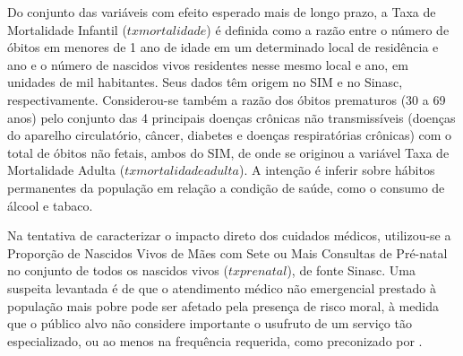 \documentclass[twoside,onecolumn,12pt]{article}
\numberwithin{outputctr}{section}
\begin{document}
Do conjunto das vari\'{a}veis com efeito esperado mais de longo prazo, a Taxa de Mortalidade Infantil ($txmortalidade$) \'{e} definida como a raz\~{a}o entre o n\'{u}mero de \'{o}bitos em menores de 1 ano de idade em um determinado local de resid\^{e}ncia e ano e o n\'{u}mero de nascidos vivos residentes nesse mesmo local e ano, em unidades de mil habitantes. Seus dados t\^{e}m origem no SIM e no Sinasc, respectivamente. Considerou-se tamb\'{e}m a raz\~{a}o dos \'{o}bitos prematuros (30 a 69 anos) pelo conjunto das 4 principais doen\c{c}as cr\^{o}nicas n\~{a}o transmiss\'{i}veis (doen\c{c}as do aparelho circulat\'{o}rio, c\^{a}ncer, diabetes e doen\c{c}as respirat\'{o}rias cr\^{o}nicas) com o total de \'{o}bitos n\~{a}o fetais, ambos do SIM, de onde se originou a vari\'{a}vel Taxa de Mortalidade Adulta ($txmortalidadeadulta$). A inten\c{c}\~{a}o \'{e} inferir sobre h\'{a}bitos permanentes da popula\c{c}\~{a}o em rela\c{c}\~{a}o a condi\c{c}\~{a}o de sa\'{u}de, como o consumo de \'{a}lcool e tabaco.

Na tentativa de caracterizar o impacto direto dos cuidados m\'{e}dicos, utilizou-se a Propor\c{c}\~{a}o de Nascidos Vivos de M\~{a}es com Sete ou Mais Consultas de Pr\'{e}-natal no conjunto de todos os nascidos vivos ($txprenatal$), de fonte Sinasc.
Uma suspeita levantada \'{e} de que o atendimento m\'{e}dico n\~{a}o emergencial prestado \`{a} popula\c{c}\~{a}o mais pobre pode ser afetado pela presen\c{c}a de risco moral, \`{a} medida que o p\'{u}blico alvo n\~{a}o considere importante o usufruto de um servi\c{c}o t\~{a}o especializado, ou ao menos na frequ\^{e}ncia requerida, como preconizado por .
\end{document}
